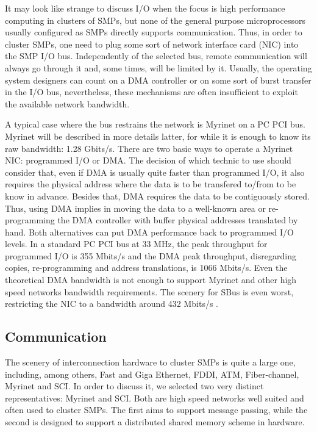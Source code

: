 	It may look like strange to discuss I/O when the focus is high performance computing in clusters of SMPs, but none of the general purpose microprocessors usually configured as SMPs directly supports communication. Thus, in order to cluster SMPs, one need to plug some sort of network interface card (NIC) into the SMP I/O bus. Independently of the selected bus, remote communication will always go through it and, some times, will be limited by it. Usually, the operating system designers can count on a DMA controller or on some sort of burst transfer in the I/O bus, nevertheless, these mechanisms are often insufficient to exploit the available network bandwidth.
	
	A typical case where the bus restrains the network is Myrinet on a PC PCI bus. Myrinet will be described in more details latter, for while it is enough to know its raw bandwidth: 1.28 Gbits/s. There are two basic ways to operate a Myrinet NIC: programmed I/O or DMA. The decision of which technic to use should consider that, even if DMA is usually quite faster than programmed I/O, it also requires the physical address where the data is to be transfered to/from to be know in advance. Besides that, DMA requires the data to be contiguously stored. Thus, using DMA implies in moving the data to a well-known area or re-programming the DMA controller with buffer physical addresses translated by hand. Both alternatives can put DMA performance back to programmed I/O levels. In a standard PC PCI bus at 33 MHz, the peak throughput for programmed I/O is 355 Mbits/s and the DMA peak throughput, disregarding copies, re-programming and address translations, is 1066 Mbits/s. Even the theoretical DMA bandwidth is not enough to support Myrinet and other high speed networks bandwidth requirements. The scenery for SBus is even worst, restricting the NIC to a bandwidth around 432 Mbits/s \cite{Pakin:95}.


\subsection{\label{hard_comm}Communication}

	The scenery of interconnection hardware to cluster SMPs is quite a large one, including, among others, Fast and Giga Ethernet, FDDI, ATM, Fiber-channel, Myrinet and SCI. In order to discuss it, we selected two very distinct representatives: Myrinet and SCI. Both are high speed networks well suited and often used to cluster SMPs. The first aims to support message passing, while the second is designed to support a distributed shared memory scheme in hardware.
	

